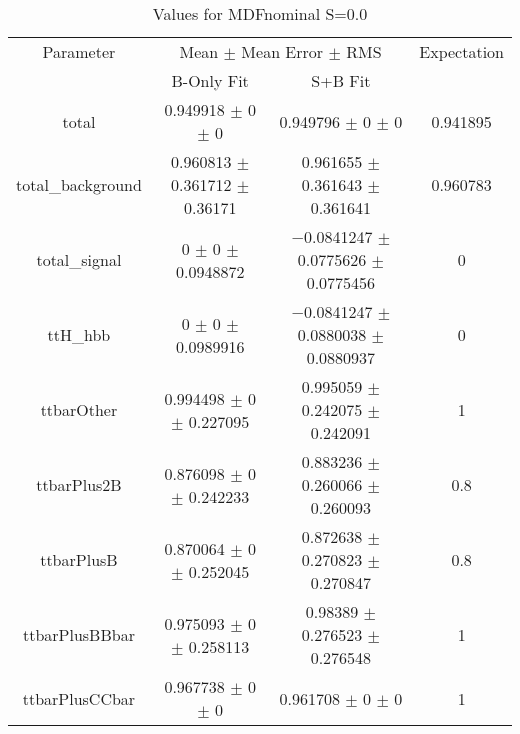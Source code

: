 \begin{table}
\centering
\caption{Values for MDFnominal S=0.0}
\begin{tabular}{cccc}
\toprule
Parameter & \multicolumn{2}{c}{Mean $\pm$ Mean Error $\pm$ RMS} & Expectation\\
 & B-Only Fit & S+B Fit & \\
\midrule
total & \num{0.949918} $\pm$ \num{0} $\pm$ \num{0} & \num{0.949796} $\pm$ \num{0} $\pm$ \num{0} & \num{0.941895}\\
total\_background & \num{0.960813} $\pm$ \num{0.361712} $\pm$ \num{0.36171} & \num{0.961655} $\pm$ \num{0.361643} $\pm$ \num{0.361641} & \num{0.960783}\\
total\_signal & \num{0} $\pm$ \num{0} $\pm$ \num{0.0948872} & \num{-0.0841247} $\pm$ \num{0.0775626} $\pm$ \num{0.0775456} & \num{0}\\
ttH\_hbb & \num{0} $\pm$ \num{0} $\pm$ \num{0.0989916} & \num{-0.0841247} $\pm$ \num{0.0880038} $\pm$ \num{0.0880937} & \num{0}\\
ttbarOther & \num{0.994498} $\pm$ \num{0} $\pm$ \num{0.227095} & \num{0.995059} $\pm$ \num{0.242075} $\pm$ \num{0.242091} & \num{1}\\
ttbarPlus2B & \num{0.876098} $\pm$ \num{0} $\pm$ \num{0.242233} & \num{0.883236} $\pm$ \num{0.260066} $\pm$ \num{0.260093} & \num{0.8}\\
ttbarPlusB & \num{0.870064} $\pm$ \num{0} $\pm$ \num{0.252045} & \num{0.872638} $\pm$ \num{0.270823} $\pm$ \num{0.270847} & \num{0.8}\\
ttbarPlusBBbar & \num{0.975093} $\pm$ \num{0} $\pm$ \num{0.258113} & \num{0.98389} $\pm$ \num{0.276523} $\pm$ \num{0.276548} & \num{1}\\
ttbarPlusCCbar & \num{0.967738} $\pm$ \num{0} $\pm$ \num{0} & \num{0.961708} $\pm$ \num{0} $\pm$ \num{0} & \num{1}\\
\bottomrule
\end{tabular}
\end{table}
